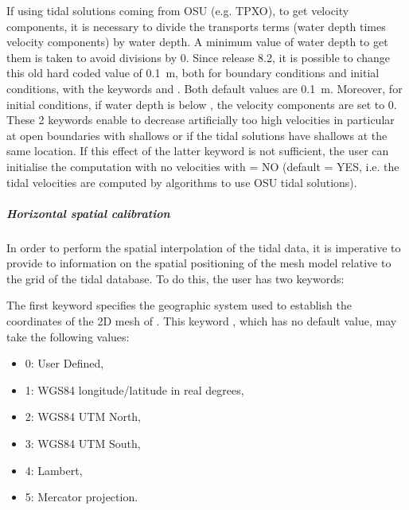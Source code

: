 If using tidal solutions coming from OSU (e.g. TPXO), to get velocity
components, it is necessary to divide the transports terms
(water depth times velocity components) by water depth.
A minimum value of water depth to get them is taken to avoid divisions by 0.
Since release 8.2, it is possible to change this old hard coded value of 0.1~m,
both for boundary conditions and initial conditions, with the keywords
 and
.
Both default values are 0.1~m.
Moreover, for initial conditions, if water depth is below
,
the velocity components are set to 0.
These 2 keywords enable to decrease artificially too high velocities
in particular at open boundaries with shallows or if the tidal solutions
have shallows at the same location.
If this effect of the latter keyword is not sufficient,
the user can initialise the computation with no velocities with
 = NO (default = YES, i.e. the
tidal velocities are computed by algorithms to use OSU tidal solutions).


\subparagraph{Horizontal spatial calibration}

In order to perform the spatial interpolation of the tidal data,
it is imperative to provide to  information on the spatial
positioning of the mesh model relative to the grid of the tidal database.
To do this, the user has two keywords:

The first keyword specifies the geographic system used to establish the
coordinates of the 2D mesh of .
This keyword , which has no default value,
may take the following values:

\begin{itemize}
\item 0: User Defined,

\item 1: WGS84 longitude/latitude in real degrees,

\item 2: WGS84 UTM North,

\item 3: WGS84 UTM South,

\item 4: Lambert,

\item 5: Mercator projection.
\end{itemize}

